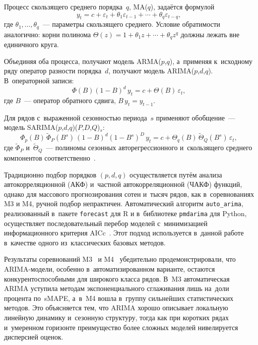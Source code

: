 Процесс скользящего среднего порядка~$q$, MA($q$), задаётся формулой
\begin{equation}
\label{eq:ma}
y_t = c + \varepsilon_t + \theta_1 \varepsilon_{t-1} + \cdots + \theta_q \varepsilon_{t-q},
\end{equation}
где $\theta_1, \ldots, \theta_q$~--- параметры скользящего среднего.
Условие обратимости аналогично: корни полинома
$\Theta(z) = 1 + \theta_1 z + \cdots + \theta_q z^q$ должны лежать
вне единичного круга.

Объединяя оба процесса, получают модель ARMA($p$,$q$), а~применяя
к~исходному ряду оператор разности порядка~$d$, получают модель
ARIMA($p$,$d$,$q$).  В~операторной записи:
\begin{equation}
\label{eq:arima}
\Phi(B)(1-B)^d\, y_t = c + \Theta(B)\,\varepsilon_t,
\end{equation}
где $B$~--- оператор обратного сдвига, $B\,y_t = y_{t-1}$.

Для рядов с~выраженной сезонностью периода~$s$ применяют обобщение~---
модель SARIMA($p$,$d$,$q$)($P$,$D$,$Q$)$_s$:
\begin{equation}
\label{eq:sarima}
\Phi_p(B)\,\tilde\Phi_P(B^s)\,(1-B)^d(1-B^s)^D\,y_t
= c + \Theta_q(B)\,\tilde\Theta_Q(B^s)\,\varepsilon_t,
\end{equation}
где $\tilde\Phi_P$ и~$\tilde\Theta_Q$~--- полиномы сезонных
авторегрессионного и~скользящего среднего компонентов
соответственно~\cite{box1970time}.

Традиционно подбор порядков $(p, d, q)$ осуществляется путём анализа
автокорреляционной (АКФ) и~частной автокорреляционной (ЧАКФ) функций,
однако для массового прогнозирования сотен и~тысяч рядов, как
в~соревнованиях M3 и M4, ручной подбор непрактичен.  Автоматический
алгоритм \texttt{auto\_arima}, реализованный в~пакете \texttt{forecast}
для R и в~библиотеке \texttt{pmdarima} для Python, осуществляет
последовательный перебор моделей с~минимизацией информационного критерия
AICc~\cite{hyndman2008expsmoothing}.  Этот подход используется
в~данной работе в~качестве одного из~классических базовых методов.

Результаты соревнований M3~\cite{makridakis2000m3} и
M4~\cite{makridakis2020m4} убедительно продемонстрировали, что
ARIMA-модели, особенно в~автоматизированном варианте, остаются
конкурентоспособными для широкого класса рядов.  В~M3 автоматическая
ARIMA уступила методам экспоненциального сглаживания лишь на~доли
процента по~sMAPE, а~в~M4 вошла в~группу сильнейших статистических
методов.  Это объясняется тем, что ARIMA хорошо описывает локальную
линейную динамику и~сезонную структуру, тогда как при коротких рядах
и~умеренном горизонте преимущество более сложных моделей нивелируется
дисперсией оценок.


